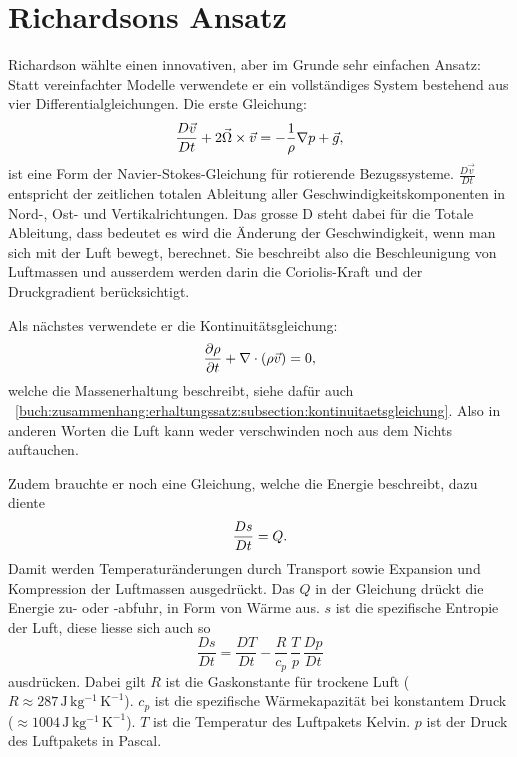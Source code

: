 %
%
%
%
\section{Richardsons Ansatz \label{geostrophisch:section:richardsonAnsatz}}

Richardson wählte einen innovativen, aber im Grunde sehr einfachen Ansatz:  
Statt vereinfachter Modelle verwendete er ein vollständiges System bestehend aus vier Differentialgleichungen.
Die erste Gleichung:
\begin{equation}
	\frac{D\vec{v}}{Dt} + 2\vec{\Omega} \times \vec{v} = -\frac{1}{\rho}\nabla p + \vec{g} \\,
	\label{eq:navstok}
\end{equation}
ist eine Form der Navier-Stokes-Gleichung für rotierende Bezugssysteme.
$\frac{D\vec{v}}{Dt}$ entspricht der zeitlichen totalen Ableitung aller Geschwindigkeitskomponenten in Nord-, Ost- und Vertikalrichtungen.
Das grosse D steht dabei für die Totale Ableitung, dass bedeutet es wird die Änderung der Geschwindigkeit, wenn man sich mit der Luft bewegt, berechnet. 
Sie beschreibt also die Beschleunigung von Luftmassen und ausserdem werden darin die Coriolis-Kraft und der Druckgradient berücksichtigt.

Als nächstes verwendete er die Kontinuitätsgleichung:
\begin{equation}
	\frac{\partial \rho}{\partial t} + \nabla \cdot (\rho \vec{v}) = 0 \\,
	\label{eq:kont}
\end{equation}
welche die Massenerhaltung beschreibt, siehe dafür auch ~\ref{buch:zusammenhang:erhaltungssatz:subsection:kontinuitaetsgleichung}.
Also in anderen Worten die Luft kann weder verschwinden noch aus dem Nichts auftauchen. 

Zudem brauchte er noch eine Gleichung, welche die Energie beschreibt, dazu diente 
\begin{equation}
	\frac{Ds}{Dt} = Q \\.
	\label{eq:enrgy}
\end{equation}
Damit werden Temperaturänderungen durch Transport sowie Expansion und Kompression der Luftmassen ausgedrückt.
Das ${Q}$ in der Gleichung drückt die Energie zu- oder -abfuhr, in Form von Wärme aus.
$s$ ist die spezifische Entropie der Luft, diese liesse sich auch so 
\begin{equation}
	\frac{Ds}{Dt} = \frac{DT}{Dt} - \frac{R}{c_p} \, \frac{T}{p} \, \frac{Dp}{Dt}
	\label{eq:enrgy2}
\end{equation}
ausdrücken.
Dabei gilt $R$ ist die Gaskonstante für trockene Luft ($R \approx 287\,\mathrm{J\,kg^{-1}\,K^{-1}}$).
$c_p$ ist die spezifische Wärmekapazität bei konstantem Druck ($\approx 1004\,\mathrm{J\,kg^{-1}\,K^{-1}}$).
$T$ ist die Temperatur des Luftpakets Kelvin.
$p$ ist der Druck des Luftpakets in Pascal.

